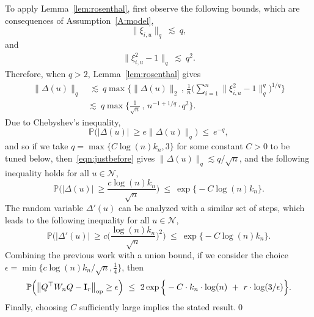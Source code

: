 \documentclass[aos,preprint]{imsart}
\numberwithin{equation}{section}
\theoremstyle{plain}
\renewcommand{\P}{\mathbb{P}}
\newcommand{\e}{\epsilon}
\newcommand{\ttop}{^{\top}}
\newcommand{\op}{_{\textup{op}}}
\newcommand{\tsum}{\textstyle\sum}
\newcommand{\ts}{\textstyle}
\newcommand{\1}{{\bf{1}}}
\newcommand{\0}{\mathbf{0}}
\begin{document}
To apply Lemma~\ref{lem:rosenthal}, first observe the following bounds, which are consequences of Assumption~\ref{A:model},
\begin{equation}
\|\xi_{i,u}\|_q \ \lesssim \  q, 
\end{equation}
and
\begin{equation}
\begin{split}
\|\xi_{i,u}^2-1\|_q \ \lesssim \ q^2.
\end{split} 
\end{equation}
Therefore, when $q>2$, Lemma~\ref{lem:rosenthal} gives
\begin{equation}\label{eqn:justbefore}
\begin{split}
\|\Delta(u)\|_q  & \ \lesssim \ q \max\Big\{ \|\Delta(u)\|_2 \, , \, \ts\frac{1}{n}\big(\tsum_{i=1}^n \|\xi_{i,u}^2-1\|_q^q\big)^{1/q}\Big\}\\[0.3cm]
%
& \lesssim \ q \max\Big\{ \ts\frac{1}{\sqrt n} \, , \, n^{-1+1/q} \cdot q^2\Big\}.
\end{split}
\end{equation} 
Due to Chebyshev's inequality,
$$\P\Big( |\Delta(u)| \ \geq e \|\Delta(u)\|_q\Big) \ \leq \ e^{-q},$$
and so if we take $q= \max\{C\log(n)k_n,3\}$ for some constant $C>0$ to be tuned below, then~\eqref{eqn:justbefore} gives $\|\Delta(u)\|_q\lesssim q/\sqrt{n}$, and the following inequality holds for all $u\in\mathcal{N}$,
$$\P\Big( |\Delta(u)| \ \geq \ts\frac{c\log(n) k_n}{\sqrt n}\Big) \ \leq \ \exp\Big\{-C\log(n) k_n\Big\}.$$
%
The random variable $\Delta'(u)$ can be analyzed with a similar set of steps, which leads to the following inequality for all $u\in\mathcal{N}$,
\begin{equation}
\P\bigg( |\Delta'(u)| \ \geq c\Big(\ts\frac{\log(n) k_n}{\sqrt n}\Big)^2\bigg) \ \leq \ \exp\Big\{-C\log(n) k_n\Big\}.
\end{equation}
%
Combining the previous work with a union bound, if we consider the choice $\e=\min\{c\log(n)k_n/\sqrt{n},\ts\frac{1}{4}\}$, then 
$$ \P\Big(\big\|Q\ttop W_n Q- \mathbf{I}_{r}\big\|\op \geq \e\Big) \ \leq \ 2\exp\Big\{ - C\cdot k_n\cdot\log(n) \ + \ r\cdot \log(3/\e)\Big\}.$$
%
Finally, choosing $C$ sufficiently large implies the stated result.\qed
 
\end{document}
